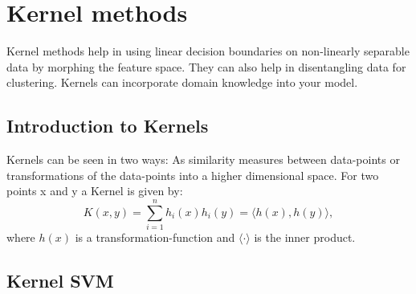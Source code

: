 \documentclass[../main.tex]{subfiles}
\begin{document}
\section{Kernel methods}
Kernel methods help in using linear decision boundaries on non-linearly separable data by morphing the feature space. They can also help in disentangling data for clustering. Kernels can incorporate domain knowledge into your model.

\subsection{Introduction to Kernels}
Kernels can be seen in two ways: As similarity measures between data-points or transformations of the data-points into a higher dimensional space. 
For two points x and y a Kernel is given by:
\begin{equation}
    K(x,y) = \sum_{i=1}^n h_i(x) h_i(y) = \langle {h(x),h(y)} \rangle,
\end{equation}
where $h(x)$ is a transformation-function and $\langle \cdot \rangle$ is the inner product. 

\subsection{Kernel SVM}
\end{document}
